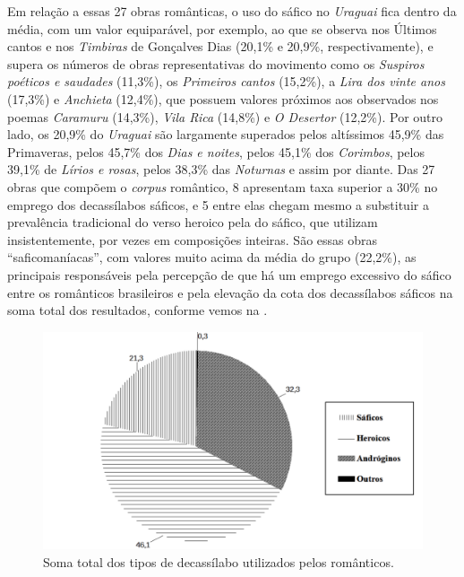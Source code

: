 \documentclass[portuguese]{textolivre}
\begin{document}
Em relação a essas 27 obras românticas, o uso do sáfico no \textit{Uraguai} fica dentro da média, com um valor equiparável, por exemplo, ao que se observa nos Últimos cantos e nos \textit{Timbiras} de Gonçalves Dias (20,1\% e 20,9\%, respectivamente), e supera os números de obras representativas do movimento como os \textit{Suspiros poéticos e saudades} (11,3\%), os \textit{Primeiros cantos} (15,2\%), a \textit{Lira dos vinte anos} (17,3\%) e \textit{Anchieta} (12,4\%), que possuem valores próximos aos observados nos poemas \textit{Caramuru} (14,3\%), \textit{Vila Rica} (14,8\%) e \textit{O Desertor} (12,2\%). Por outro lado, os 20,9\% do \textit{Uraguai} são largamente superados pelos altíssimos 45,9\% das Primaveras, pelos 45,7\% dos \textit{Dias e noites}, pelos 45,1\% dos \textit{Corimbos}, pelos 39,1\% de \textit{Lírios e rosas}, pelos 38,3\% das \textit{Noturnas} e assim por diante. Das 27 obras que compõem o \textit{corpus} romântico, 8 apresentam taxa superior a 30\% no emprego dos decassílabos sáficos, e 5 entre elas chegam mesmo a substituir a prevalência tradicional do verso heroico pela do sáfico, que utilizam insistentemente, por vezes em composições inteiras. São essas obras “saficomaníacas”, com valores muito acima da média do grupo (22,2\%), as principais responsáveis pela percepção de que há um emprego excessivo do sáfico entre os românticos brasileiros e pela elevação da cota dos decassílabos sáficos na soma total dos resultados, conforme vemos na .

\begin{figure}[!h]
    \centering
    \begin{minipage}{.75\textwidth}
    \includegraphics[width=\linewidth]{fig-003.pdf}
    \caption{Soma total dos tipos de decassílabo utilizados pelos românticos.}
    \label{fig3}
    \end{minipage}
\end{figure}
\end{document}
